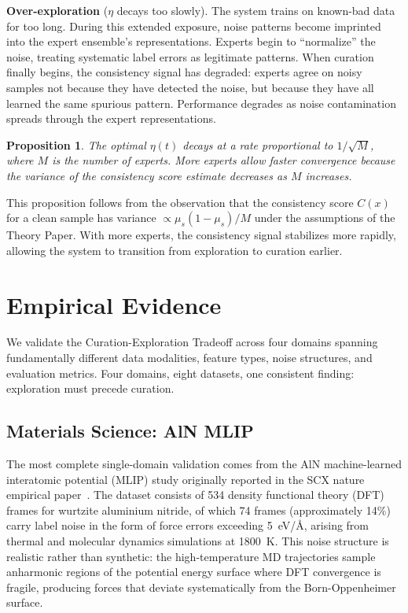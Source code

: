 \documentclass{article}
\newtheorem{proposition}[theorem]{Proposition}
\begin{document}
\textbf{Over-exploration} ($\eta$ decays too slowly). The system trains on known-bad data for too long. During this extended exposure, noise patterns become imprinted into the expert ensemble's representations. Experts begin to ``normalize'' the noise, treating systematic label errors as legitimate patterns. When curation finally begins, the consistency signal has degraded: experts agree on noisy samples not because they have detected the noise, but because they have all learned the same spurious pattern. Performance degrades as noise contamination spreads through the expert representations.

\begin{proposition}
The optimal $\eta(t)$ decays at a rate proportional to $1/\sqrt{M}$, where $M$ is the number of experts. More experts allow faster convergence because the variance of the consistency score estimate decreases as $M$ increases.
\label{prop:eta_optimal}
\end{proposition}

This proposition follows from the observation that the consistency score $C(x)$ for a clean sample has variance $\propto \mu_s(1-\mu_s)/M$ under the assumptions of the Theory Paper. With more experts, the consistency signal stabilizes more rapidly, allowing the system to transition from exploration to curation earlier.

\section{Empirical Evidence}
\label{sec:evidence}

We validate the Curation-Exploration Tradeoff across four domains spanning fundamentally different data modalities, feature types, noise structures, and evaluation metrics. Four domains, eight datasets, one consistent finding: exploration must precede curation.

\subsection{Materials Science: AlN MLIP}
\label{sec:aln}

The most complete single-domain validation comes from the AlN machine-learned interatomic potential (MLIP) study originally reported in the SCX nature empirical paper~\cite{scx2025nature}. The dataset consists of 534 density functional theory (DFT) frames for wurtzite aluminium nitride, of which 74 frames (approximately 14\%) carry label noise in the form of force errors exceeding 5~eV/\AA, arising from thermal and molecular dynamics simulations at 1800~K. This noise structure is realistic rather than synthetic: the high-temperature MD trajectories sample anharmonic regions of the potential energy surface where DFT convergence is fragile, producing forces that deviate systematically from the Born-Oppenheimer surface.
\end{document}
